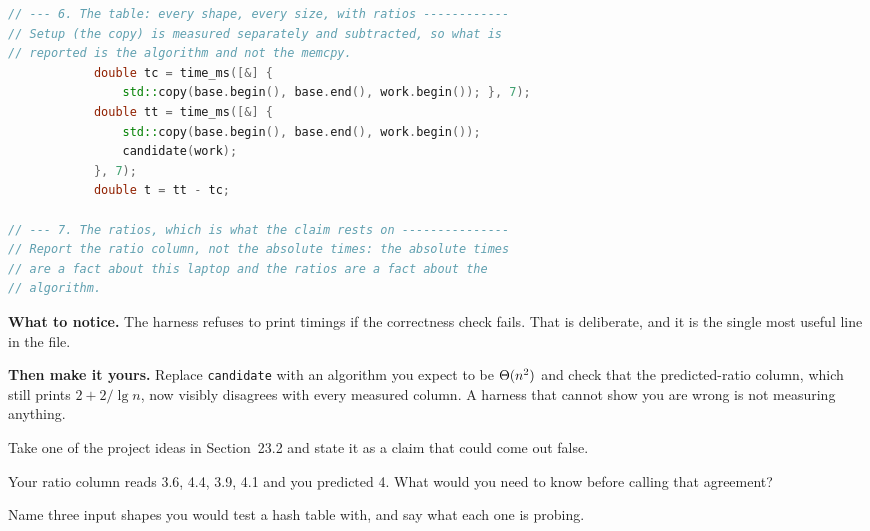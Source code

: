 \begin{lab}
\begin{lstlisting}[language=C++]
// --- 6. The table: every shape, every size, with ratios ------------
// Setup (the copy) is measured separately and subtracted, so what is
// reported is the algorithm and not the memcpy.
            double tc = time_ms([&] {
                std::copy(base.begin(), base.end(), work.begin()); }, 7);
            double tt = time_ms([&] {
                std::copy(base.begin(), base.end(), work.begin());
                candidate(work);
            }, 7);
            double t = tt - tc;

// --- 7. The ratios, which is what the claim rests on ---------------
// Report the ratio column, not the absolute times: the absolute times
// are a fact about this laptop and the ratios are a fact about the
// algorithm.
\end{lstlisting}

\textbf{What to notice.} The harness refuses to print timings if the
correctness check fails. That is deliberate, and it is the single most useful
line in the file.

\smallskip
\textbf{Then make it yours.} Replace \texttt{candidate} with an algorithm you
expect to be $\Theta(n^{2})$ and check that the predicted-ratio column, which
still prints $2 + 2/\lg n$, now visibly disagrees with every measured column.
A harness that cannot show you are wrong is not measuring anything.
\end{lab}

\begin{checkpoint}
\begin{tightnum}
  \item Take one of the project ideas in Section~23.2 and state it as a claim
        that could come out false.
  \item Your ratio column reads 3.6, 4.4, 3.9, 4.1 and you predicted 4. What
        would you need to know before calling that agreement?
  \item Name three input shapes you would test a hash table with, and say what
        each one is probing.
\end{tightnum}
\end{checkpoint}

